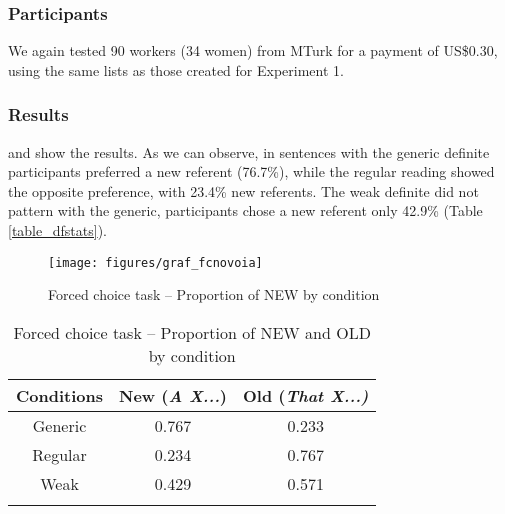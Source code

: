 \documentclass[output=paper,
modfonts
]{langscibook}
\begin{document}
\subsubsection{Participants}

We again tested 90 workers (34 women) from MTurk for a payment of US\$0.30, using the same lists as those created for Experiment 1. 

\subsubsection{Results}

 and  show the results. As we can observe,  in sentences with the generic definite participants preferred a new referent (76.7\%), while the regular reading showed the opposite preference, with 23.4\% new referents. The weak definite did not pattern with the generic, participants chose a new referent only 42.9\% (Table \ref{table_dfstats}). 

\begin{figure}[p]
\centering
\texttt{[image: figures/graf\_fcnovoia]}
\caption{Forced choice task -- Proportion of NEW by condition}
\label{fig:desaetal:7}
\end{figure}

\begin{table}[p]
\centering
\caption{Forced choice task -- Proportion of NEW and OLD by condition}
\label{tab:desaetal:4}
\begin{tabularx}{.60\textwidth}{ccc}
\lsptoprule
{Conditions} & {New (\textit{A X...})} & {Old (\textit{That X...)}} \\ 
\midrule
Generic & 0.767 & 0.233 \\ 
Regular & 0.234 & 0.767 \\ 
Weak & 0.429 & 0.571 \\ 
\lspbottomrule
\end{tabularx}
\end{table}
\end{document}

